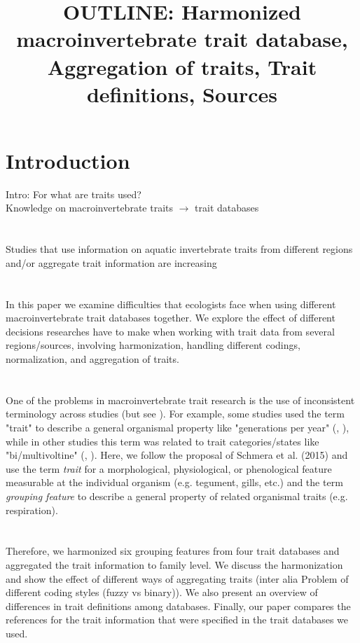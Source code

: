 \documentclass{article}
\title{ OUTLINE: Harmonized macroinvertebrate trait database, Aggregation of traits, Trait definitions, Sources }
\author{}%
\date{}%
\begin{document}
\maketitle

\section{Introduction}

Intro: For what are traits used?\\
Knowledge on macroinvertebrate traits $\rightarrow$ trait databases
\\
\\
\\
Studies that use information on aquatic invertebrate traits from different regions
and/or aggregate trait information are increasing %
\\
\\
\\
In this paper we examine difficulties that ecologists face when using 
different macroinvertebrate trait databases together. We explore the 
effect of different decisions researches have to make when working with
trait data from several regions/sources, involving harmonization, 
handling different codings, normalization, and aggregation of traits.
\\
\\
\\

One of the problems in macroinvertebrate trait research is the use
of inconsistent terminology across studies (but see \cite{schmera_proposed_2015}). 
For example, some studies used the term "trait" to describe a general 
organismal property like "generations per year" (\cite{statzner_reproductive_1997}, 
\cite{ussegliopolatera_biological_2000}), while in other studies this 
term was related to trait categories/states like "bi/multivoltine" 
(\cite{haybach_use_2004}, \cite{vieira_database_nodate}). 
Here, we follow the proposal of Schmera et al. (2015) and use the term 
\textit{trait} for a morphological, physiological, or phenological 
feature measurable at the individual organism (e.g. tegument, gills, etc.) 
and the term \textit{grouping feature} to describe a general property 
of related organismal traits (e.g. respiration).
\\
\\
\\
Therefore, we harmonized six grouping features from four trait databases and 
aggregated the trait information to family level. %
We discuss the harmonization and show the effect of different ways of aggregating 
traits (inter alia Problem of different coding styles (fuzzy vs binary)).
We also present an overview of differences in trait definitions among databases.
Finally, our paper compares the references for the trait information that 
were specified in the trait databases we used.
\end{document}
